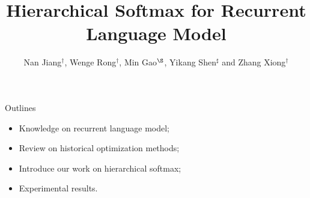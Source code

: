\documentclass[english]{beamer} %
\begin{document}
\title[HSM \& RNN]{Hierarchical Softmax for Recurrent Language Model}

\author{Nan Jiang$^{\dag}$, Wenge Rong$^{\dag}$, Min Gao$^{\S}$, Yikang Shen$^{\sharp}$ and Zhang Xiong$^{\dag}$}



\begin{frame}
  \titlepage
\end{frame}

\newcommand{\Gaussian}{\rput(0,-0.35){\psset{yunit=0.8cm,xunit=0.3}
     \psGauss[linecolor=red, linewidth=0.8pt, sigma=0.5]{-1.5}{1.5}}}
\def\dedge{\ncline[linestyle=dashed]}
\def\omitnode{\Tr*[edge=\dedge]{}}



\begin{frame}[<+->]{Outlines}
\begin{itemize}
\item Knowledge on recurrent language model;
\item Review on historical optimization methods;
\item Introduce our work on hierarchical softmax;
\item Experimental results.
\end{itemize}
\end{frame}
\end{document}
